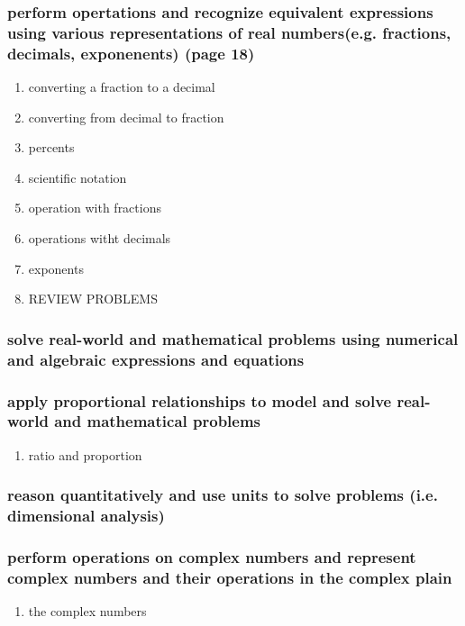\documentclass[11pt]{article}
\begin{document}
\subsubsection{perform opertations and recognize equivalent expressions using various representations of real numbers(e.g. fractions, decimals, exponenents) (page 18)}
\label{sec:org4b5e0c8}
\begin{enumerate}
\item converting a fraction to a decimal
\label{sec:org0e606f6}
\item converting from decimal to fraction
\label{sec:org2fe2708}
\item percents
\label{sec:org823264f}
\item scientific notation
\label{sec:org93f8419}
\item operation with fractions
\label{sec:org8982997}
\item operations witht decimals
\label{sec:org1fa24d0}
\item exponents
\label{sec:org3587131}
\item REVIEW PROBLEMS
\label{sec:org9869cd1}
\end{enumerate}
\subsubsection{solve real-world and mathematical problems using numerical and algebraic expressions and equations}
\label{sec:org2d255b2}
\subsubsection{apply proportional relationships to model and solve real-world and mathematical problems}
\label{sec:org0222a45}
\begin{enumerate}
\item ratio and proportion
\label{sec:orgce5ce6f}
\end{enumerate}
\subsubsection{reason quantitatively and use units to solve problems (i.e. dimensional analysis)}
\label{sec:org2dd06c3}
\subsubsection{perform operations on complex numbers and represent complex numbers and their operations in the complex plain}
\label{sec:org2880e28}
\begin{enumerate}
\item the complex numbers
\label{sec:org98d3794}
\end{enumerate}
\end{document}
